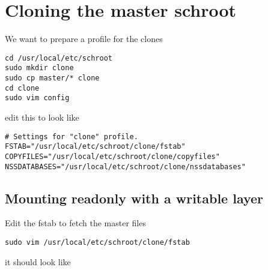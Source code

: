 \documentclass[a4paper]{book}
\begin{document}
\section{Cloning the master schroot}

We want to prepare a profile for the clones

\begin{verbatim}
cd /usr/local/etc/schroot
sudo mkdir clone
sudo cp master/* clone
cd clone
sudo vim config
\end{verbatim}

edit this to look like

\begin{verbatim}
# Settings for "clone" profile.
FSTAB="/usr/local/etc/schroot/clone/fstab"
COPYFILES="/usr/local/etc/schroot/clone/copyfiles"
NSSDATABASES="/usr/local/etc/schroot/clone/nssdatabases"
\end{verbatim}

\subsection{Mounting readonly with a writable layer}

Edit the fstab to fetch the master files

\begin{verbatim}
sudo vim /usr/local/etc/schroot/clone/fstab
\end{verbatim}

it should look like
\end{document}
